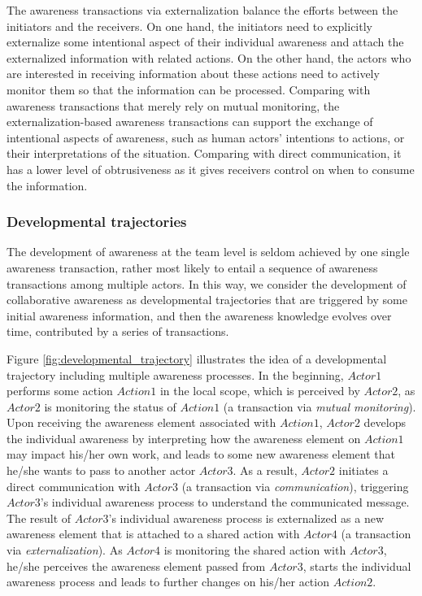 The awareness transactions via externalization balance the efforts between the initiators and the receivers. On one hand, the initiators need to explicitly externalize some intentional aspect of their individual awareness and attach the externalized information with related actions. On the other hand, the actors who are interested in receiving information about these actions need to actively monitor them so that the information can be processed. Comparing with awareness transactions that merely rely on mutual monitoring, the externalization-based awareness transactions can support the exchange of intentional aspects of awareness, such as human actors' intentions to actions, or their interpretations of the situation. Comparing with direct communication, it has a lower level of obtrusiveness as it gives receivers control on when to consume the information.

\subsubsection{Developmental trajectories} %
\label{ssub:developmental_trajectories}
The development of awareness at the team level is seldom achieved by one single awareness transaction, rather most likely to entail a sequence of awareness transactions among multiple actors. In this way, we consider the development of collaborative awareness as developmental trajectories \cite{strauss1993continual} that are triggered by some initial awareness information, and then the awareness knowledge evolves over time, contributed by a series of transactions.

Figure \ref{fig:developmental_trajectory} illustrates the idea of a developmental trajectory including multiple awareness processes. In the beginning, $Actor1$ performs some action $Action1$ in the local scope, which is perceived by $Actor2$, as $Actor2$ is monitoring the status of $Action1$ (a transaction via \emph{mutual monitoring}). Upon receiving the awareness element associated with $Action1$, $Actor2$ develops the individual awareness by interpreting how the awareness element on $Action1$ may impact his/her own work, and leads to some new awareness element that he/she wants to pass to another actor $Actor3$. As a result, $Actor2$ initiates a direct communication with $Actor3$ (a transaction via \emph{communication}), triggering $Actor3$'s individual awareness process to understand the communicated message. The result of $Actor3$'s individual awareness process is externalized as a new awareness element that is attached to a shared action with $Actor4$ (a transaction via \emph{externalization}). As $Actor4$ is monitoring the shared action with $Actor3$, he/she perceives the awareness element passed from $Actor3$, starts the individual awareness process and leads to further changes on his/her action $Action2$.

